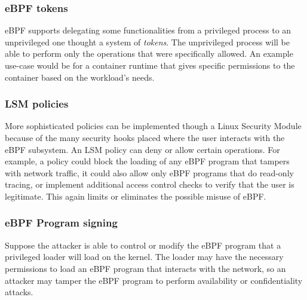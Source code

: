 \subsubsection*{eBPF tokens}

eBPF supports delegating some functionalities from a privileged process to an
unprivileged one thought a system of \textit{tokens}. The unprivileged process
will be able to perform only the operations that were specifically allowed. An
example use-case would be for a container runtime that gives specific
permissions to the container based on the workload's needs.

\subsubsection*{LSM policies}

More sophisticated policies can be implemented though a Linux Security Module
because of the many security hooks placed where the user interacts with the eBPF
subsystem. An LSM policy can deny or allow certain operations. For example, a
policy could block the loading of any eBPF program that tampers with network
traffic, it could also allow only eBPF programs that do read-only tracing, or
implement additional access control checks to verify that the user is
legitimate. This again limits or eliminates the possible misuse of eBPF.

\subsubsection*{eBPF Program signing}

Suppose the attacker is able to control or modify the eBPF program that a
privileged loader will load on the kernel. The loader may have the necessary
permissions to load an eBPF program that interacts with the network, so an
attacker may tamper the eBPF program to perform availability or confidentiality
attacks.

